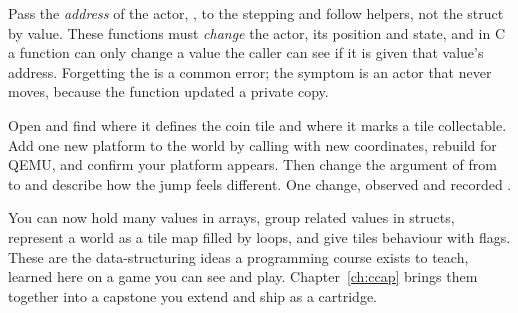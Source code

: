 \begin{prgwarn}
Pass the \emph{address} of the actor, , to the stepping and
follow helpers, not the struct by value. These functions must \emph{change} the
actor, its position and state, and in C a function can only change a value the
caller can see if it is given that value's address. Forgetting the \code{\&} is a
common error; the symptom is an actor that never moves, because the function
updated a private copy.
\end{prgwarn}

\begin{prgtry}
Open  and find where it defines the coin
tile and where it marks a tile collectable. Add one new platform to the world by
calling  with new coordinates, rebuild for QEMU, and confirm your
platform appears. Then change the  argument of
 from  to  and describe how the
jump feels different. One change, observed and recorded \citep{prg32repo}.
\end{prgtry}

\begin{prgcheck}
You can now hold many values in arrays, group related values in structs, represent
a world as a tile map filled by loops, and give tiles behaviour with flags. These
are the data-structuring ideas a programming course exists to teach, learned here
on a game you can see and play. Chapter~\ref{ch:ccap} brings them together into a
capstone you extend and ship as a cartridge.
\end{prgcheck}
